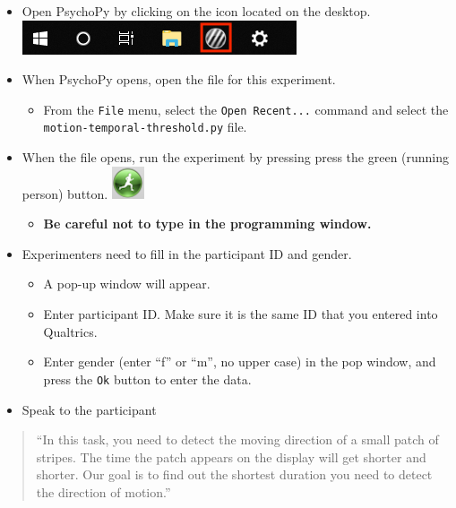 \documentclass[]{article}
\providecommand{\tightlist}{%
  \setlength{\itemsep}{0pt}\setlength{\parskip}{0pt}}
\begin{document}
\begin{itemize}
\tightlist
\item
  Open PsychoPy by clicking on the icon located on the desktop.
  \includegraphics{images/PsychoPy-1.PNG}\\
\item
  When PsychoPy opens, open the file for this experiment.

  \begin{itemize}
  \tightlist
  \item
    From the \texttt{File} menu, select the \texttt{Open\ Recent...}
    command and select the \texttt{motion-temporal-threshold.py} file.
  \end{itemize}
\item
  When the file opens, run the experiment by pressing press the green
  (running person) button. \includegraphics{images/PPrunningMan.png}

  \begin{itemize}
  \tightlist
  \item
    \textbf{Be careful not to type in the programming window.}
  \end{itemize}
\item
  Experimenters need to fill in the participant ID and gender.

  \begin{itemize}
  \tightlist
  \item
    A pop-up window will appear.
  \item
    Enter participant ID. Make sure it is the same ID that you entered
    into Qualtrics.
  \item
    Enter gender (enter ``f'' or ``m'', no upper case) in the pop
    window, and press the \texttt{Ok} button to enter the data.
  \end{itemize}
\item
  Speak to the participant
\end{itemize}

\begin{quote}
``In this task, you need to detect the moving direction of a small patch
of stripes. The time the patch appears on the display will get shorter
and shorter. Our goal is to find out the shortest duration you need to
detect the direction of motion.''
\end{quote}
\end{document}
